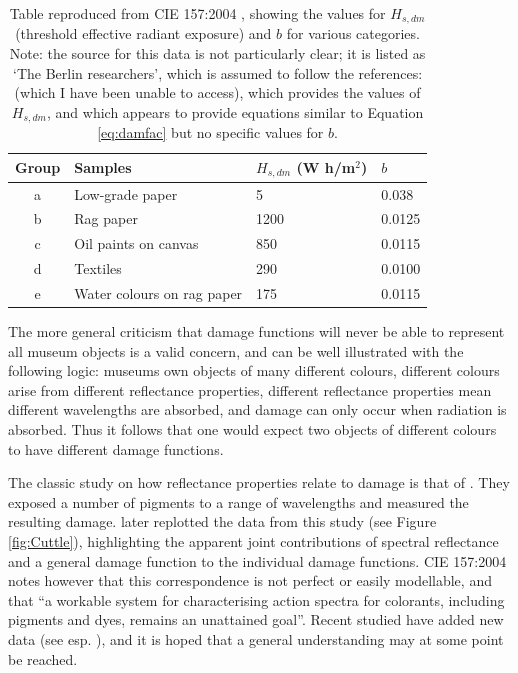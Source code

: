 \begin{table}[htbp]
\centering
\begin{tabular}{|c|l|l|l|}
\hline
Group & Samples & $H_{s,dm}$ (W h/m$^{2}$) & $b$ \\ \hline
a & Low-grade paper & 5 & 0.038 \\ \hline
b & Rag paper & 1200 & 0.0125 \\ \hline
c & Oil paints on canvas & 850 & 0.0115 \\ \hline
d & Textiles & 290 & 0.0100 \\ \hline
e & Water colours on rag paper & 175 & 0.0115 \\ \hline
\end{tabular}
\caption{Table reproduced from \gls{CIE} 157:2004 \citep{cie_cie_2004}, showing the values for $H_{s,dm}$ (threshold effective radiant exposure) and $b$ for various categories. Note: the source for this data is not particularly clear; it is listed as `The Berlin researchers', which is assumed to follow the references: \citet{cie_cie_1991} (which I have been unable to access), \citet{hilbert_zur_1991} which provides the values of $H_{s,dm}$, and \citet{krochmann_beleuchtung_1988} which appears to provide equations similar to Equation \ref{eq:damfac} but no specific values for $b$.}
\label{tab:b}
\end{table}

The more general criticism that damage functions will never be able to represent all museum objects is a valid concern, and can be well illustrated with the following logic: museums own objects of many different colours, different colours arise from different reflectance properties, different reflectance properties mean different wavelengths are absorbed, and damage can only occur when radiation is absorbed. Thus it follows that one would expect two objects of different colours to have different damage functions. 

The classic study on how reflectance properties relate to damage is that of \citet{saunders_wavelength-dependent_1994}. They exposed a number of pigments to a range of wavelengths and measured the resulting damage. %
\citet{cuttle_control_1999} later replotted the data from this study (see Figure \ref{fig:Cuttle}), highlighting the apparent joint contributions of spectral reflectance and a general damage function to the individual damage functions. \gls{CIE} 157:2004 notes however that this correspondence is not perfect or easily modellable, and that ``a workable system for characterising action spectra for colorants, including pigments and dyes, remains an unattained goal''. Recent studied have added new data (see esp. \citet{villmann_wavelength_2018}), and it is hoped that a general understanding may at some point be reached.

